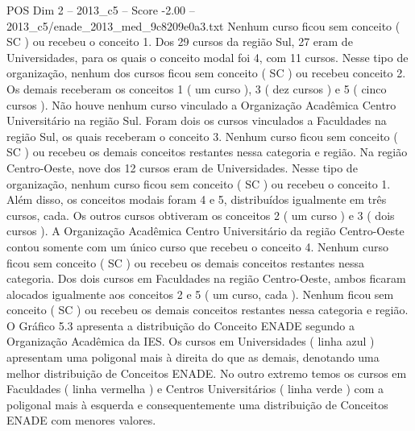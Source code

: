 \begin{textsample}{POS Dim 2 – 2013\_c5 – Score -2.00 – 2013\_c5/enade\_2013\_med\_9c8209e0a3.txt}
Nenhum curso ficou sem conceito ( SC ) ou recebeu o conceito 1.
Dos 29 cursos da região Sul, 27 eram de Universidades, para os quais o conceito modal foi 4, com 11 cursos.
Nesse tipo de organização, nenhum dos cursos ficou sem conceito ( SC ) ou recebeu conceito 2.
Os demais receberam os conceitos 1 ( um curso ), 3 ( dez cursos ) e 5 ( cinco cursos ).
Não houve nenhum curso vinculado a Organização Acadêmica Centro Universitário na região Sul.
Foram dois os cursos vinculados a Faculdades na região Sul, os quais receberam o conceito 3.
Nenhum curso ficou sem conceito ( SC ) ou recebeu os demais conceitos restantes nessa categoria e região.
Na região Centro-Oeste, nove dos 12 cursos eram de Universidades.
Nesse tipo de organização, nenhum curso ficou sem conceito ( SC ) ou recebeu o conceito 1.
Além disso, os conceitos modais foram 4 e 5, distribuídos igualmente em três cursos, cada.
Os outros cursos obtiveram os conceitos 2 ( um curso ) e 3 ( dois cursos ).
A Organização Acadêmica Centro Universitário da região Centro-Oeste contou somente com um único curso que recebeu o conceito 4.
Nenhum curso ficou sem conceito ( SC ) ou recebeu os demais conceitos restantes nessa categoria.
Dos dois cursos em Faculdades na região Centro-Oeste, ambos ficaram alocados igualmente aos conceitos 2 e 5 ( um curso, cada ).
Nenhum ficou sem conceito ( SC ) ou recebeu os demais conceitos restantes nessa categoria e região.
O Gráfico 5.3 apresenta a distribuição do Conceito ENADE segundo a Organização Acadêmica da IES.
Os cursos em Universidades ( linha azul ) apresentam uma poligonal mais à direita do que as demais, denotando uma melhor distribuição de Conceitos ENADE.
No outro extremo temos os cursos em Faculdades ( linha vermelha ) e Centros Universitários ( linha verde ) com a poligonal mais à esquerda e consequentemente uma distribuição de Conceitos ENADE com menores valores.

\end{textsample}
